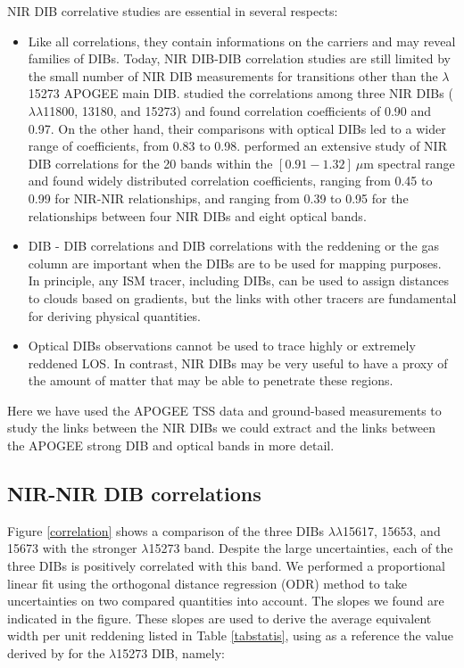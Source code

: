 \documentclass[printer]{aa} %
\begin{document}
NIR DIB correlative studies are essential in several respects:
\begin{itemize}
\item Like all correlations, they contain informations on the carriers and may reveal families of DIBs. Today, NIR DIB-DIB correlation studies are still limited by the small number of NIR DIB measurements for transitions other than the $\lambda$15273 APOGEE main DIB. \cite{Cox14} studied the correlations among three  NIR DIBs ($\lambda\lambda$11800, 13180, and 15273) and found correlation coefficients of 0.90 and 0.97. On the other hand, their comparisons with optical DIBs led to a wider range of coefficients, from 0.83 to 0.98. \cite{Hamano15,Hamano16} performed an extensive study of NIR DIB correlations for the 20 bands within the $[ 0.91 - 1.32] \: \mu$m spectral range and found widely distributed correlation coefficients, ranging from 0.45 to 0.99 for NIR-NIR relationships, and ranging from 0.39 to 0.95 for the relationships between four NIR DIBs and eight optical bands. 
\item DIB - DIB correlations  and DIB correlations with the reddening or the gas column are important when the DIBs are to be used
for mapping purposes. In principle, any ISM tracer, including DIBs, can be used to assign distances to clouds based on gradients, but the links with other tracers are fundamental for deriving physical quantities. 
\item Optical DIBs observations cannot be used to trace highly or extremely reddened LOS. In contrast, NIR DIBs may be very useful to have a proxy of the amount of matter that may be able to penetrate these regions. 
\end{itemize}
Here we have used the APOGEE TSS data and ground-based measurements to study the links between the NIR DIBs we could extract and the links between the APOGEE strong DIB and optical bands in
more detail. 

\subsection{NIR-NIR DIB correlations}

Figure \ref{correlation} shows a comparison of the three DIBs $\lambda\lambda$15617, 15653, and 15673 with the stronger $\lambda$15273 band. Despite the large uncertainties, each of the three DIBs is positively correlated with this band. We performed a proportional linear fit using the orthogonal distance regression (ODR) method to take uncertainties on two compared quantities into account. The slopes we found are indicated in the figure. These slopes are used to derive the average equivalent width per unit reddening listed in Table \ref{tabstatis}, using as a reference the value derived by \cite{Zasowski15} for the $\lambda$15273 DIB, namely: 
 
\end{document}
